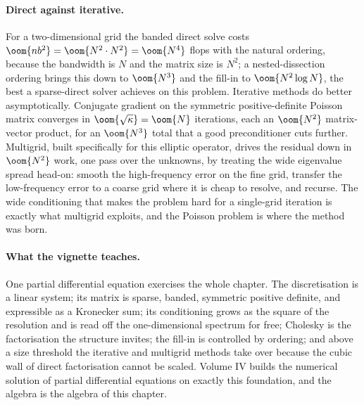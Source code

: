 \paragraph{Direct against iterative.}
For a two-dimensional grid the banded direct solve costs $\oom{n b^{2}}
= \oom{N^{2} \cdot N^{2}} = \oom{N^{4}}$ flops with the natural
ordering, because the bandwidth is $N$ and the matrix size is $N^{2}$; a
nested-dissection ordering brings this down to $\oom{N^{3}}$ and the
fill-in to $\oom{N^{2}\log N}$, the best a sparse-direct solver
achieves on this problem. Iterative methods do better asymptotically.
Conjugate gradient on the symmetric positive-definite Poisson matrix
converges in $\oom{\sqrt{\kappa}} = \oom{N}$ iterations, each an
$\oom{N^{2}}$ matrix-vector product, for an $\oom{N^{3}}$ total that a
good preconditioner cuts further. Multigrid, built specifically for this
elliptic operator, drives the residual down in $\oom{N^{2}}$ work, one
pass over the unknowns, by treating the wide eigenvalue spread head-on:
smooth the high-frequency error on the fine grid, transfer the
low-frequency error to a coarse grid where it is cheap to resolve, and
recurse. The wide conditioning that makes the problem hard for a
single-grid iteration is exactly what multigrid exploits, and the
Poisson problem is where the method was born.

\paragraph{What the vignette teaches.}
One partial differential equation exercises the whole chapter. The
discretisation is a linear system; its matrix is sparse, banded,
symmetric positive definite, and expressible as a Kronecker sum; its
conditioning grows as the square of the resolution and is read off the
one-dimensional spectrum for free; Cholesky is the factorisation the
structure invites; the fill-in is controlled by ordering; and above a
size threshold the iterative and multigrid methods take over because the
cubic wall of direct factorisation cannot be scaled. Volume IV builds
the numerical solution of partial differential equations on exactly this
foundation, and the algebra is the algebra of this chapter.

